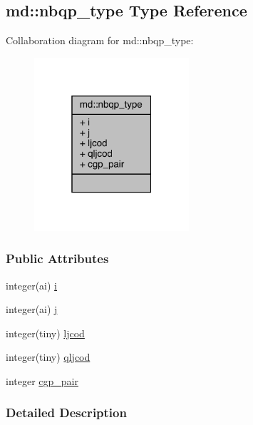 \hypertarget{structmd_1_1nbqp__type}{\subsection{md\-:\-:nbqp\-\_\-type Type Reference}
\label{structmd_1_1nbqp__type}
}


Collaboration diagram for md\-:\-:nbqp\-\_\-type\-:
\nopagebreak
\begin{figure}[H]
\begin{center}
\leavevmode
\includegraphics[width=163pt]{structmd_1_1nbqp__type__coll__graph}
\end{center}
\end{figure}
\subsubsection*{Public Attributes}
\begin{DoxyCompactItemize}
\item 
integer(ai) \hyperlink{structmd_1_1nbqp__type_a4a6ed8634a13381f6cdbd1611e06819d}{i}
\item 
integer(ai) \hyperlink{structmd_1_1nbqp__type_a277900b9ea357550a707f7855b8fa1a9}{j}
\item 
integer(tiny) \hyperlink{structmd_1_1nbqp__type_aaf42b9142e745088eb3d1fef05067b1f}{ljcod}
\item 
integer(tiny) \hyperlink{structmd_1_1nbqp__type_a4f100f69a7bf4c40d87f173ac025ccdc}{qljcod}
\item 
integer \hyperlink{structmd_1_1nbqp__type_a0675e7ae2cdfb5ea8f006d57609a91a5}{cgp\-\_\-pair}
\end{DoxyCompactItemize}


\subsubsection{Detailed Description}


